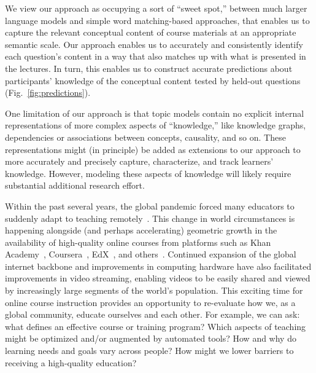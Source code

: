 \documentclass[10pt]{article}
\begin{document}
We view our approach as occupying a sort of ``sweet spot,'' between much larger
language models and simple word matching-based approaches, that enables us to
capture the relevant conceptual content of course materials at an appropriate
semantic scale. Our approach enables us to accurately and consistently identify
each question's content in a way that also matches up with what is presented in
the lectures. In turn, this enables us to construct accurate predictions about
participants' knowledge of the conceptual content tested by held-out questions
(Fig.~\ref{fig:predictions}).

One limitation of our approach is that topic models contain no explicit
internal representations of more complex aspects of ``knowledge,'' like
knowledge graphs, dependencies or associations between concepts, causality, and
so on. These representations might (in principle) be added as extensions to our
approach to more accurately and precisely capture, characterize, and track
learners' knowledge. However, modeling these aspects of knowledge will likely
require substantial additional research effort.

Within the past several years, the global pandemic forced many educators to
suddenly adapt to teaching remotely~\citep{MoseEtal21, ShimLee20, KawaEtal21,
Whal20}. This change in world circumstances is happening alongside (and perhaps
accelerating) geometric growth in the availability of high-quality online
courses from platforms such as Khan Academy~\citep{Khan04},
Coursera~\citep{Youn12}, EdX~\citep{Kolo13}, and others~\citep{RhoaEtal13}.
Continued expansion of the global internet backbone and improvements in
computing hardware have also facilitated improvements in video streaming,
enabling videos to be easily shared and viewed by increasingly large segments
of the world's population. This exciting time for online course instruction
provides an opportunity to re-evaluate how we, as a global community, educate
ourselves and each other. For example, we can ask: what defines an effective
course or training program? Which aspects of teaching might be optimized and/or
augmented by automated tools? How and why do learning needs and goals vary
across people? How might we lower barriers to receiving a high-quality
education?
\end{document}

